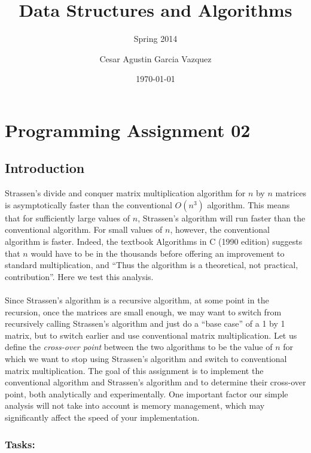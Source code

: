 \documentclass[tikz, 12pt]{scrartcl}
\title{Data Structures and Algorithms}
\subtitle{Spring 2014}
\author{Cesar Agustin Garcia Vazquez}
\date{\today}                                           %
\begin{document}
\maketitle
\section{Programming Assignment 02}

\subsection{Introduction}

Strassen's divide and conquer matrix multiplication algorithm for $n$ by $n$ matrices is asymptotically faster than the conventional $O(n^3)$ algorithm. This means that for sufficiently large values of $n$, Strassen's algorithm will run faster than the conventional algorithm. For small values of $n$, however, the conventional algorithm is faster. Indeed, the textbook Algorithms in C (1990 edition) suggests that $n$ would have to be in the thousands before offering an improvement to standard multiplication, and ``Thus the algorithm is a theoretical, not practical, contribution''. Here we test this analysis.\\
\\
Since Strassen's algorithm is a recursive algorithm, at some point in the recursion, once the matrices are small enough, we may want to switch from recursively calling Strassen's algorithm and just do a ``base case'' of a 1 by 1 matrix, but to switch earlier and use conventional matrix multiplication. Let us define the \textit{cross-over point} between the two algorithms to be the value of $n$ for which we want to stop using Strassen's algorithm and switch to conventional matrix multiplication. The goal of this assignment is to implement the conventional algorithm and Strassen's algorithm and to determine their cross-over point, both analytically and experimentally. One important factor our simple analysis will not take into account is memory management, which may significantly affect the speed of your implementation.
\subsubsection*{Tasks:}
\end{document}
